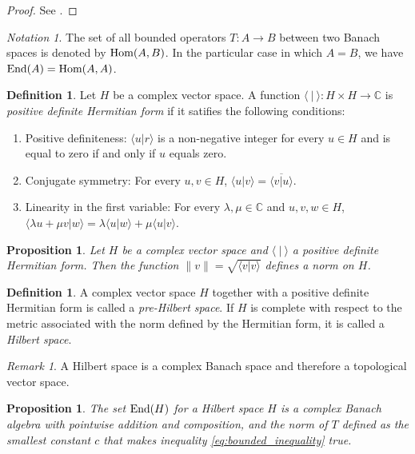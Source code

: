 \documentclass[12pt]{article}
\newtheorem{prop}[theorem]{Proposition}
\theoremstyle{definition}
\newtheorem{dfn}[theorem]{Definition}
\theoremstyle{remark}
\newtheorem{rem}[theorem]{Remark}
\newtheorem{notation}[theorem]{Notation}
\newcommand{\Comp}{\mathbb{C}}
\newcommand{\Hom}[2]{\textup{Hom}(#1,#2)}
\newcommand{\End}[1]{\textup{End}(#1)}
\begin{document}
    \begin{proof}
        See \cite[Ch. II, Prop. 1.1]{Conway1985}.
    \end{proof}

    \begin{notation}
        The set of all bounded operators $T\colon A\to B$ between two Banach spaces is denoted by $\Hom{A}{B}$. In the particular case in which $A=B$, we have $\End{A}=\Hom{A}{A}$.
    \end{notation}

    \begin{dfn}
        Let $H$ be a complex vector space. A function $\langle\ |\ \rangle\colon H\times H\to\Comp$ is \emph{positive definite Hermitian form} if it satifies the following conditions:
        \begin{enumerate}
            \item Positive definiteness: $\langle u|r\rangle$ is a non-negative integer for every $u\in H$ and is equal to zero if and only if $u$ equals zero.
            \item Conjugate symmetry: For every $u,v\in H$, $\langle u|v\rangle = \overline{\langle v|u \rangle}$.
            \item Linearity in the first variable: For every $\lambda,\mu\in\Comp$ and $u,v,w\in H$, $\langle\lambda u+\mu v|w\rangle=\lambda\langle u|w\rangle+\mu\langle u|v\rangle$.
        \end{enumerate}
    \end{dfn}
    
    \begin{prop}
        Let $H$ be a complex vector space and $\langle\ |\ \rangle$ a positive definite Hermitian form. Then the function $\|v\|=\sqrt{\langle v|v \rangle}$ defines a norm on $H$.
    \end{prop}

    \begin{dfn}
        A complex vector space $H$ together with a positive definite Hermitian form is called a \emph{pre-Hilbert space}. If $H$ is complete with respect to the metric associated with the norm defined by the Hermitian form, it is called a \emph{Hilbert space}.
    \end{dfn}

    \begin{rem}
        A Hilbert space is a complex Banach space and therefore a topological vector space.
    \end{rem}

    \begin{prop}
        The set \( \End{H} \) for a Hilbert space \( H \) is a complex Banach algebra with pointwise addition and composition, and the norm of \( T \) defined as the smallest constant \( c \) that makes inequality \eqref{eq:bounded_inequality} true.
    \end{prop}
\end{document}
